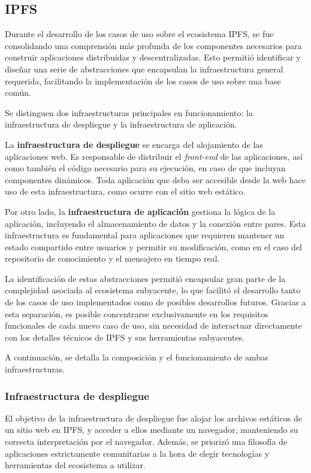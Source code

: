 \subsection{IPFS}

Durante el desarrollo de los casos de uso sobre el ecosistema IPFS, se fue consolidando una comprensión más profunda de los componentes necesarios para construir aplicaciones distribuidas y descentralizadas. Esto permitió identificar y diseñar una serie de abstracciones que encapsulan la infraestructura general requerida, facilitando la implementación de los casos de uso sobre una base común.

Se distinguen dos infraestructuras principales en funcionamiento: la infraestructura de despliegue y la infraestructura de aplicación.

La \textbf{infraestructura de despliegue} se encarga del alojamiento de las aplicaciones web. Es responsable de distribuir el \textit{front-end} de las aplicaciones, así como también el código necesario para su ejecución, en caso de que incluyan componentes dinámicos. Toda aplicación que deba ser accesible desde la web hace uso de esta infraestructura, como ocurre con el sitio web estático.

Por otro lado, la \textbf{infraestructura de aplicación} gestiona la lógica de la aplicación, incluyendo el almacenamiento de datos y la conexión entre pares. Esta infraestructura es fundamental para aplicaciones que requieren mantener un estado compartido entre usuarios y permitir su modificación, como en el caso del repositorio de conocimiento y el mensajero en tiempo real.

La identificación de estas abstracciones permitió encapsular gran parte de la complejidad asociada al ecosistema subyacente, lo que facilitó el desarrollo tanto de los casos de uso implementados como de posibles desarrollos futuros. Gracias a esta separación, es posible concentrarse exclusivamente en los requisitos funcionales de cada nuevo caso de uso, sin necesidad de interactuar directamente con los detalles técnicos de IPFS y sus herramientas subyacentes.

A continuación, se detalla la composición y el funcionamiento de ambas infraestructuras.

\subsubsection{Infraestructura de despliegue}

El objetivo de la infraestructura de despliegue fue alojar los archivos estáticos de un sitio web en IPFS, y acceder a ellos mediante un navegador, manteniendo su correcta interpretación por el navegador. Además, se priorizó una filosofía de aplicaciones estrictamente comunitarias a la hora de elegir tecnologías y herramientas del ecosistema a utilizar.

